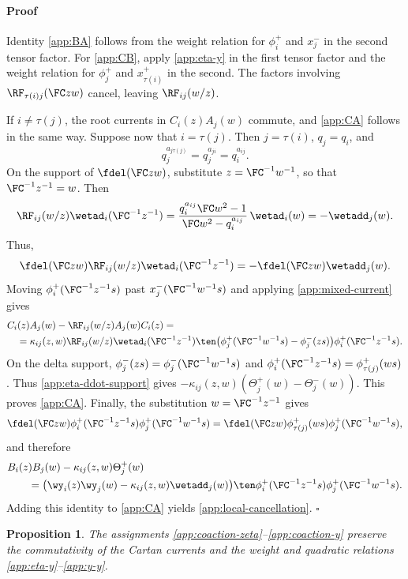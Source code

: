 \documentclass[reqno]{amsart}
\numberwithin{equation}{section}
\newtheorem*{proposition}{Proposition}
\newenvironment{pf}{\medskip\paragraph{{\sc Proof}}}{\hfill$\square$\par\medskip}
\begin{document}
\begin{pf}
	Identity \eqref{app:BA} follows from the weight relation for $\phi_i^+$ and $x_j^-$ in the second tensor factor. For \eqref{app:CB}, apply \eqref{app:eta-y} in the first tensor factor and the weight relation for $\phi_j^+$ and $x_{\tau(i)}^+$ in the second. The factors involving $\RF_{\tau(i)j}(\FC zw)$ cancel, leaving $\RF_{ij}(w/z)$.

	If $i\neq\tau(j)$, the root currents in $C_i(z)A_j(w)$ commute, and \eqref{app:CA} 
	follows in the same way. Suppose now that $i=\tau(j)$. Then $j=\tau(i)$, $q_j=q_i$, and
	\[
	q_j^{a_{j\tau(j)}}=q_j^{a_{ji}}=q_i^{a_{ij}}.
	\]
	On the support of $\fdel(\FC zw)$, substitute
	$z={\FC^{-1}w^{-1}}$, so that ${\FC^{-1}z^{-1}}=w$. Then
	\[
	\RF_{ij}(w/z)\wetad_i({\FC^{-1}z^{-1}})
	=\frac{q_i^{a_{ij}}\FC w^2-1}{\FC w^2-q_i^{a_{ij}}}\,\wetad_i(w)
	=-\wetadd_j(w).
	\]
	Thus,
	\begin{equation}
		\fdel(\FC zw)\RF_{ij}(w/z)\wetad_i({\FC^{-1}z^{-1}})
		=-\fdel(\FC zw)\wetadd_j(w).
		\label{app:eta-ddot-support}
	\end{equation}
		Moving $\phi_i^+({\FC^{-1}z^{-1}} s)$ past
		$x_j^-({\FC^{-1}w^{-1}} s)$ and applying \eqref{app:mixed-current} gives
		\[
		\begin{aligned}
			&C_i(z)A_j(w)-\RF_{ij}(w/z)A_j(w)C_i(z)=\\
			&\quad=\kappa_{ij}(z,w)\RF_{ij}(w/z)\wetad_i({\FC^{-1}z^{-1}})
			\ten\bigl(\phi_j^+({\FC^{-1}w^{-1}} s)-\phi_j^-(zs)\bigr)
			\phi_i^+({\FC^{-1}z^{-1}} s).
		\end{aligned}
		\]
		On the delta support, $\phi_j^-(zs)=\phi_j^-({\FC^{-1}w^{-1}} s)$ and
		$\phi_i^+({\FC^{-1}z^{-1}} s)=\phi_{\tau(j)}^+(ws)$. Thus
		\eqref{app:eta-ddot-support} gives
		$-\kappa_{ij}(z,w)(\Theta_j^+(w)-\Theta_j^-(w))$.
	This proves \eqref{app:CA}. Finally, the substitution $w={\FC^{-1}z^{-1}}$ gives
	\[
	\fdel(\FC zw)\phi_i^+({\FC^{-1}z^{-1}} s)\phi_j^+({\FC^{-1}w^{-1}} s)=\fdel(\FC zw)\phi_{\tau(j)}^+(ws)\phi_j^+({\FC^{-1}w^{-1}} s),
	\]
	and therefore
	\[
	\begin{aligned}
		&B_i(z)B_j(w)-\kappa_{ij}(z,w)\Theta_j^+(w)\\
		&\qquad=\bigl(\wy_i(z)\wy_j(w)
		-\kappa_{ij}(z,w)\wetadd_j(w)\bigr)
		\ten \phi_i^+({\FC^{-1}z^{-1}} s)\phi_j^+({\FC^{-1}w^{-1}} s).
	\end{aligned}
	\]
	Adding this identity to \eqref{app:CA} yields
	\eqref{app:local-cancellation}.
\end{pf}

\begin{proposition}
	The assignments \eqref{app:coaction-zeta}--\eqref{app:coaction-y} preserve the commutativity of the Cartan currents and the weight and quadratic relations \eqref{app:eta-y}--\eqref{app:y-y}.
\end{proposition}
\end{document}
